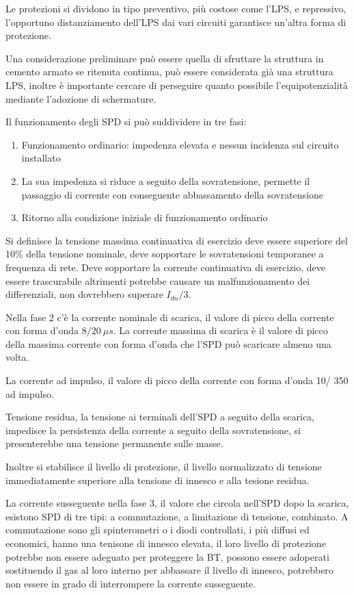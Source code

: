 Le protezioni si dividono in tipo preventivo, più costose come l'LPS, e repressivo, l'opportuno distanziamento dell'LPS dai vari circuiti garantisce un'altra forma di protezione.

Una considerazione preliminare può essere quella di sfruttare la struttura in cemento armato se ritenuta continua, può essere considerata già una struttura LPS, inoltre è importante cercare di perseguire quanto possibile l'equipotenzialità mediante l'adozione di schermature.

Il funzionamento degli SPD si può suddividere in tre fasi:
\begin{enumerate}
    \item Funzionamento ordinario: impedenza elevata e nessun incidenza sul circuito installato
    \item La sua impedenza si riduce a seguito della sovratensione, permette il passaggio di corrente con conseguente abbassamento della sovratensione
    \item Ritorno alla condizione iniziale di funzionamento ordinario
\end{enumerate}

Si definisce la tensione massima continuativa di esercizio deve essere 
superiore del 10\% della tensione nominale, deve sopportare le sovratensioni 
temporanee a frequenza di rete.
Deve sopportare la corrente continuativa di esercizio, deve essere trascurabile 
altrimenti potrebbe causare un malfunzionamento dei differenziali, non 
dovrebbero superare $I_{dn}/3$.

Nella fase 2 c'è la corrente nominale di scarica, il valore di picco della 
corrente con forma d'onda $8/20\ \mu s$. La corrente massima di scarica è il 
valore di picco della massima corrente con forma d'onda che l'SPD può scaricare 
almeno una volta.

La corrente ad impulso, il valore di picco della corrente con forma d'onda 10/
350 ad impulso.

Tensione residua, la tensione ai terminali dell'SPD a seguito della scarica, 
impedisce la persistenza della corrente a seguito della sovratensione, si 
presenterebbe una tensione permanente sulle masse. 

Inoltre si stabilisce il livello di protezione, il livello normalizzato di 
tensione immediatamente superiore alla tensione di innesco e alla tesione 
residua. 

La corrente susseguente nella fase 3, il valore che circola nell'SPD dopo la 
scarica, esistono SPD di tre tipi: a commutazione, a limitazione di tensione, 
combinato.
A commutazione sono gli spinterometri o i diodi controllati, i più diffusi ed 
economici, hanno una tenisone di innesco elevata, il loro livello di protezione 
potrebbe non essere adeguato per proteggere la BT, possono essere adoperati 
sostituendo il gas al loro interno per abbassare il livello di innesco, 
potrebbero non essere in grado di interrompere la corrente susseguente.

